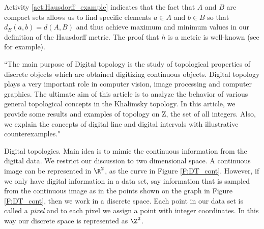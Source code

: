 Activity \ref{act:Hausdorff_example} indicates that the fact that $A$ and $B$ are compact sets allows us to find specific elements $a \in A$ and $b \in B$ so that $d_E(a,b) = d(A,B)$ and thus achieve maximum and minimum values in our definition of the Hausdorff metric. The proof that $h$ is a metric is well-known (see \cite{Barnsley, Edgar} for example). 

\begin{comment}
The only property that requires significant work is the triangle inequality. 

To prove the triangle inequality, let $A,B,C$ be compact subsets of a metric space $(X,d)$. We know that either $h(A,C) = d(A,C)$ or $h(A,C) = d(C,A)$. Without loss of generality, assume $h(A,C) = d(A,C)$. Choose $a \in A$ such that $d(a,C) = d(A,C) = h(A,C)$. Now choose $c \in C$ such that $d_E(a,c) = d(a,C) = h(A,C)$.  

Let $b_a \in B$ and $c_a \in C$ such that $d_E(a,b_a) = d(a,B)$ and $d_E(b_a, c_a) = d(b_a,C)$. Since $d_E(a,c) = \min_{c' \in C} \{d_E(a,c')\}$, we know $d_E(a,c) \leq d_E(a,c_a)$. The triangle inequality for the Euclidean metric gives us 
\[h(A,C) = d(A,C) = d_E(a,c) \leq d_E(a,c_a) \leq d_E(a,b_a) + d_E(b_a,c_a) = d(a,B) + d(b_a,C).\]
Since $d(a,B) \leq d(A,B)$ and $d(b_a,C) \leq d(B,C)$, we have 
\[h(A,C) \leq d(A,B) + d(B,C) \leq h(A,B) + h(A,C).\] 
\end{comment}



``The main purpose of Digital topology is the study of topological properties of discrete
objects which are obtained digitizing continuous objects. Digital topology plays a very
important role in computer vision, image processing and computer graphics. The ultimate
aim of this article is to analyze the behavior of various general topological concepts in the
Khalimsky topology. In this article, we provide some results and examples of topology on
Z, the set of all integers. Also, we explain the concepts of digital line and digital intervals
with illustrative counterexamples."

Digital topologies. Main idea is to mimic the continuous information from the digital data. We restrict our discussion to two dimensional space. A continuous image can be represented in $\R^2$, as the curve in Figure \ref{F:DT_cont}. However, if we only have digital information in a data set, say information that is sampled from the continuous image as in the points shown on the graph in Figure \ref{F:DT_cont}, then we work in a discrete space. Each point in our data set is called a \emph{pixel} and to each pixel we assign a point with integer coordinates. In this way our discrete space is represented as $\Z^2$. 

